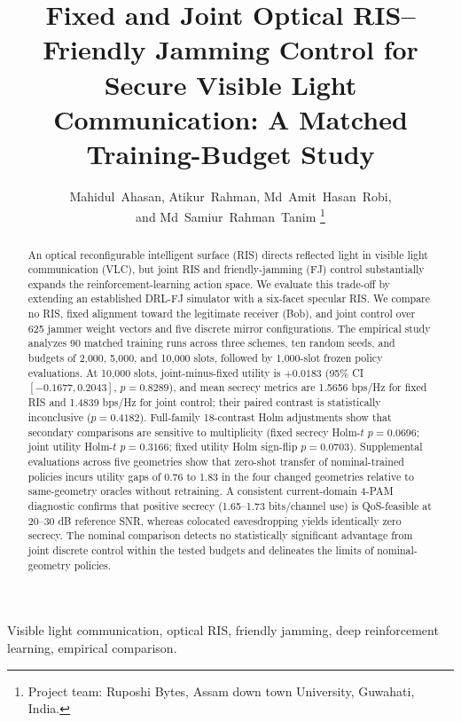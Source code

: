\documentclass[journal,10pt,twocolumn]{IEEEtran}
\begin{document}
\title{Fixed and Joint Optical RIS--Friendly Jamming Control for Secure Visible Light Communication: A Matched Training-Budget Study}
\author{Mahidul~Ahasan, Atikur~Rahman, Md~Amit~Hasan~Robi,\\
and Md~Samiur~Rahman~Tanim%
\thanks{Project team: Ruposhi Bytes, Assam down town University, Guwahati, India.}}
\maketitle
\begin{abstract}
An optical reconfigurable intelligent surface (RIS) directs reflected light in visible light communication (VLC), but joint RIS and friendly-jamming (FJ) control substantially expands the reinforcement-learning action space. We evaluate this trade-off by extending an established DRL-FJ simulator with a six-facet specular RIS. We compare no RIS, fixed alignment toward the legitimate receiver (Bob), and joint control over 625 jammer weight vectors and five discrete mirror configurations. The empirical study analyzes 90 matched training runs across three schemes, ten random seeds, and budgets of 2,000, 5,000, and 10,000 slots, followed by 1,000-slot frozen policy evaluations. At 10,000 slots, joint-minus-fixed utility is $+0.0183$ (95\% CI $[-0.1677, 0.2043]$, $p=0.8289$), and mean secrecy metrics are 1.5656 bps/Hz for fixed RIS and 1.4839 bps/Hz for joint control; their paired contrast is statistically inconclusive ($p=0.4182$). Full-family 18-contrast Holm adjustments show that secondary comparisons are sensitive to multiplicity (fixed secrecy Holm-$t$ $p=0.0696$; joint utility Holm-$t$ $p=0.3166$; fixed utility Holm sign-flip $p=0.0703$). Supplemental evaluations across five geometries show that zero-shot transfer of nominal-trained policies incurs utility gaps of 0.76 to 1.83 in the four changed geometries relative to same-geometry oracles without retraining. A consistent current-domain 4-PAM diagnostic confirms that positive secrecy (1.65--1.73 bits/channel use) is QoS-feasible at 20--30 dB reference SNR, whereas colocated eavesdropping yields identically zero secrecy. The nominal comparison detects no statistically significant advantage from joint discrete control within the tested budgets and delineates the limits of nominal-geometry policies.
\end{abstract}
\begin{IEEEkeywords}
Visible light communication, optical RIS, friendly jamming, deep reinforcement learning, empirical comparison.
\end{IEEEkeywords}
\end{document}
